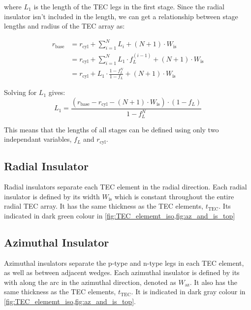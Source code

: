 \documentclass[10pt,a4paper,twocolumn]{article}
\begin{document}
where $L_1$ is the length of the TEC legs in the first stage. Since the radial insulator isn't included in the length, we can get a relationship between stage lengths and radius of the TEC array as:

\begin{equation*}
  \begin{aligned}
    r_{\text{base}} & = r_{\text{cyl}} + \sum_{i=1}^{N} L_i + (N+1) \cdot W_{\text{is}}                    \\
                    & =  r_{\text{cyl}} + \sum_{i=1}^{N} L_1 \cdot f_L^{(i-1)} + (N+1) \cdot W_{\text{is}} \\
                    & =  r_{\text{cyl}} + L_1 \cdot \frac{1-f_L^{N}}{1-f_L} + (N+1) \cdot W_{\text{is}}
  \end{aligned}
\end{equation*}

Solving for $L_1$ gives:
\begin{equation}
  L_1 = \frac{(r_{\text{base}} - r_{\text{cyl}} - (N+1) \cdot W_{\text{is}}) \cdot (1-f_L)}{1-f_L^{N}}
\end{equation}

This means that the lengths of all stages can be defined using only two independant variables, $f_L$ and $r_{\text{cyl}}$.

\subsection{Radial Insulator}

Radial insulators separate each TEC element in the radial direction. Each radial insulator is defined by its width $W_{\text{is}}$ which is constant throughout the entire radial TEC array. It has the same thickness as the TEC elements, $t_{\text{TEC}}$. Its indicated in dark green colour in \cref{fig:TEC_elememt_iso,fig:az_and_is_top}

\subsection{Azimuthal Insulator}

Azimuthal insulators separate the p-type and n-type legs in each TEC element, as well as between adjacent wedges. Each azimuthal insulator is defined by its with along the arc in the azimuthal direction, denoted as $W_{\text{az}}$. It also has the same thickness as the TEC elements, $t_{\text{TEC}}$. It is indicated in dark gray colour in \cref{fig:TEC_elememt_iso,fig:az_and_is_top}.
\end{document}
